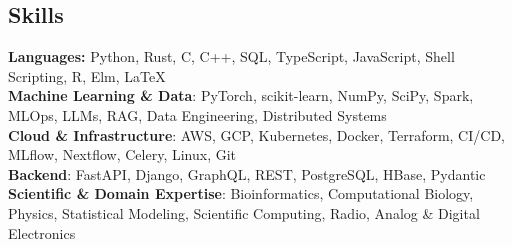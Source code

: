 \documentclass[margin,line]{resume}
\begin{document}
\begin{resume}

    \section{\mysidestyle Skills}\vspace{0mm}%
    \textbf{Languages:} Python, Rust, C, C++, SQL, TypeScript, JavaScript, Shell Scripting, R, Elm, \LaTeX
    \vspace{1mm}\\\vspace{0mm}%
    \textbf{Machine Learning \& Data}: PyTorch, scikit-learn, NumPy, SciPy, Spark, MLOps, LLMs, RAG, Data Engineering, Distributed Systems
    \vspace{1mm}\\\vspace{0mm}%
    \textbf{Cloud \& Infrastructure}: AWS, GCP, Kubernetes, Docker, Terraform, CI/CD, MLflow, Nextflow, Celery, Linux, Git
    \vspace{1mm}\\\vspace{0mm}%
    \textbf{Backend}: FastAPI, Django, GraphQL, REST, PostgreSQL, HBase, Pydantic
    \vspace{1mm}\\\vspace{0mm}%
    \textbf{Scientific \& Domain Expertise}: Bioinformatics, Computational Biology, Physics, Statistical Modeling, Scientific Computing, Radio, Analog \& Digital Electronics
    \vspace{1mm}\\\vspace{0mm}%


\end{resume}
\end{document}
